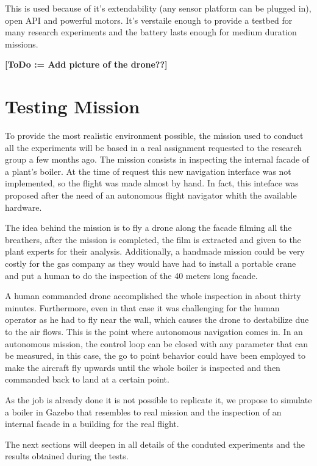  This is used because of it's extendability (any sensor platform can be plugged in), open API and powerful motors. It's verstaile enough to provide a testbed for many research experiments and the battery lasts enough for medium duration missions.

  \textbf{[ToDo := Add picture of the drone??]}

\section{Testing Mission} \label{ch_5:sect:testing_mission}

  To provide the most realistic environment possible, the mission used to conduct all the experiments will be based in a real assignment requested to the research group a few months ago. The mission consists in inspecting the internal facade of a plant's boiler. At the time of request this new navigation interface was not implemented, so the flight was made almost by hand. In fact, this inteface was proposed after the need of an autonomous flight navigator whith the available hardware.

  The idea behind the mission is to fly a drone along the facade filming all the breathers, after the mission is completed, the film is extracted and given to the plant experts for their analysis. Additionally, a handmade mission could be very costly for the gas company as they would have had to install a portable crane and put a human to do the inspection of the 40 meters long facade.

  A human commanded drone accomplished the whole inspection in about thirty minutes. Furthermore, even in that case it was challenging for the human operator as he had to fly near the wall, which causes the drone to destabilize due to the air flows. This is the point where autonomous navigation comes in. In an autonomous mission, the control loop can be closed with any parameter that can be measured, in this case, the go to point behavior could have been employed to make the aircraft fly upwards until the whole boiler is inspected and then commanded back to land at a certain point.

  As the job is already done it is not possible to replicate it, we propose to simulate a boiler in Gazebo that resembles to real mission and the inspection of an internal facade in a building for the real flight.

  The next sections will deepen in all details of the conduted experiments and the results obtained during the tests.

